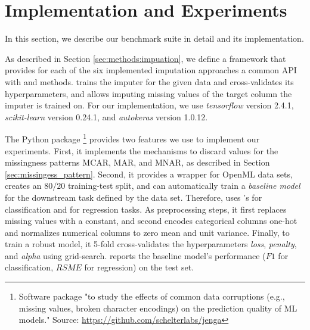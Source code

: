 \section{Implementation and Experiments}
%
In this section, we describe our benchmark suite in detail and its implementation.

As described in Section \ref{sec:methods:impuation}, we define a framework that provides for each of the six implemented imputation approaches a common API with  and  methods.  trains the imputer for the given data and cross-validates its hyperparameters, and  allows imputing missing values of the target column the imputer is trained on. For our implementation, we use \emph{tensorflow} version 2.4.1, \emph{scikit-learn} version 0.24.1, and \emph{autokeras} version 1.0.12.

The Python package \footnote{Software package "to study the effects of common data corruptions (e.g., missing values, broken character encodings) on the prediction quality of ML models." Source: \url{https://github.com/schelterlabs/jenga}} \citep{Jenga} provides two features we use to implement our experiments. First, it implements the mechanisms to discard values for the missingness patterns MCAR, MAR, and MNAR, as described in Section \ref{sec:missingess_pattern}. Second, it provides a wrapper for OpenML data sets, creates an $80/20$ training-test split, and can automatically train a \emph{baseline model} for the downstream task defined by the data set. Therefore,  uses 's  for classification and  for regression tasks. As preprocessing steps, it first replaces missing values with a constant, and second encodes categorical columns one-hot and normalizes numerical columns to zero mean and unit variance. Finally, to train a robust model, it 5-fold cross-validates the hyperparameters \emph{loss}, \emph{penalty}, and \emph{alpha} using grid-search.  reports the baseline model's performance ($F1$ for classification, $RSME$ for regression) on the test set.



